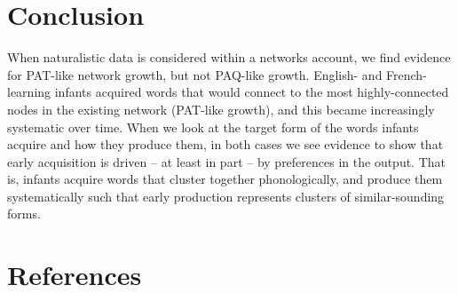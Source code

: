 \documentclass[
  man,mask,floatsintext]{apa6}
\begin{document}
\hypertarget{conclusion}{%
\section{Conclusion}\label{conclusion}}

When naturalistic data is considered within a networks account, we find evidence for PAT-like network growth, but not PAQ-like growth. English- and French-learning infants acquired words that would connect to the most highly-connected nodes in the existing network (PAT-like growth), and this became increasingly systematic over time. When we look at the target form of the words infants acquire and how they produce them, in both cases we see evidence to show that early acquisition is driven -- at least in part -- by preferences in the output. That is, infants acquire words that cluster together phonologically, and produce them systematically such that early production represents clusters of similar-sounding forms.

\newpage

\hypertarget{references}{%
\section{References}\label{references}}

\begingroup
\setlength{\parindent}{-0.5in}
\setlength{\leftskip}{0.5in}
\end{document}
